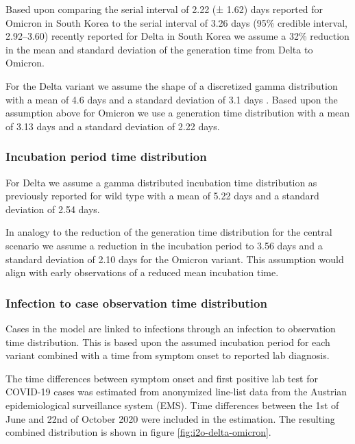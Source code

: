 \documentclass[
]{article}
\begin{document}
Based upon comparing the serial interval of 2.22 (± 1.62) days reported for Omicron in South Korea \autocite{SerialIntervalBasic}
to the serial interval of 3.26 days (95\% credible interval, 2.92--3.60) recently reported
for Delta in South Korea \autocite{hwangTransmissionDynamicsDelta2021} we assume a 32\% reduction
in the mean and standard deviation of the generation time from Delta to Omicron.

For the Delta variant we assume the shape of a discretized gamma distribution \autocite{coriNewFrameworkSoftware2013}
with a mean of 4.6 days and a standard deviation of 3.1 days \autocite{hartGenerationTimeAlpha2021}.
Based upon the assumption above for Omicron we use a generation time distribution with a mean of
3.13 days and a standard deviation of 2.22 days.

\hypertarget{methods-incubation}{%
\subsubsection{Incubation period time distribution}\label{methods-incubation}}

For Delta we assume a gamma distributed incubation time distribution as previously reported for
wild type with a mean of 5.22 days and a standard deviation of 2.54 days. \autocite{zhangEvolvingEpidemiologyTransmission2020}

In analogy to the reduction of the generation time distribution for the central scenario
we assume a reduction in the incubation period to 3.56 days and a standard deviation of 2.10 days
for the Omicron variant. This assumption would align with early observations of a reduced
mean incubation time. \autocite{jansenInvestigationSARSCoV25292021}

\hypertarget{infection-to-case-observation-time-distribution}{%
\subsubsection{Infection to case observation time distribution}\label{infection-to-case-observation-time-distribution}}

Cases in the model are linked to infections through an infection to observation time
distribution. This is based upon the assumed incubation period for each variant
combined with a time from symptom onset to reported lab diagnosis.

The time differences between symptom onset and first positive lab test for COVID-19 cases was estimated
from anonymized line-list data from the Austrian epidemiological surveillance system (EMS).
Time differences between the 1st of June and 22nd of October 2020 were included in the estimation.
The resulting combined distribution is shown in figure \ref{fig:i2o-delta-omicron}.
\end{document}
